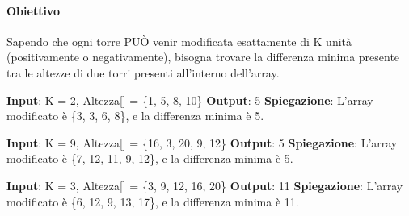     \paragraph{Obiettivo} Sapendo che ogni torre PUÒ venir modificata esattamente di K unità (positivamente o negativamente), bisogna trovare la differenza minima presente tra le altezze di due torri presenti all'interno dell'array.
    \begin{esempio}
        \newline
        \textbf{Input}: K = 2, Altezza[] = \{1, 5, 8, 10\}
        \newline
        \textbf{Output}: 5
        \newline
        \textbf{Spiegazione}: L'array modificato è \{3, 3, 6, 8\}, e la differenza minima è 5.
    \end{esempio}
    \begin{esempio}
        \newline
        \textbf{Input}: K = 9, Altezza[] = \{16, 3, 20, 9, 12\}
        \newline
        \textbf{Output}: 5
        \newline
        \textbf{Spiegazione}: L'array modificato è \{7, 12, 11, 9, 12\}, e la differenza minima è 5.
    \end{esempio}
    \begin{esempio}
        \newline
        \textbf{Input}: K = 3, Altezza[] = \{3, 9, 12, 16, 20\}
        \newline
        \textbf{Output}: 11
        \newline
        \textbf{Spiegazione}: L'array modificato è \{6, 12, 9, 13, 17\}, e la differenza minima è 11.
    \end{esempio}